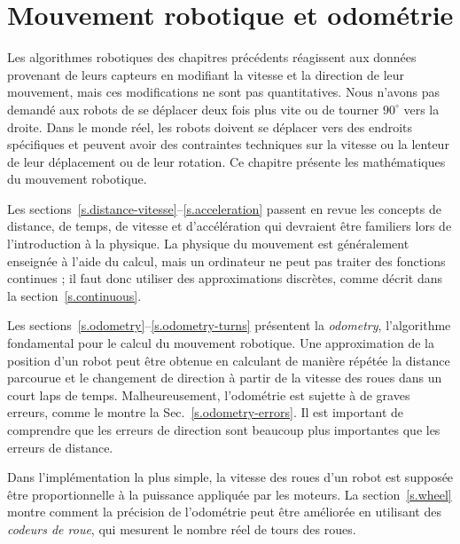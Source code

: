
\chapter{Mouvement robotique et odométrie}\label{ch.motion}

Les algorithmes robotiques des chapitres précédents réagissent aux données provenant de leurs capteurs en modifiant la vitesse et la direction de leur mouvement, mais ces modifications ne sont pas quantitatives. Nous n'avons pas demandé aux robots de se déplacer deux fois plus vite ou de tourner $90^\circ$ vers la droite. Dans le monde réel, les robots doivent se déplacer vers des endroits spécifiques et peuvent avoir des contraintes techniques sur la vitesse ou la lenteur de leur déplacement ou de leur rotation. Ce chapitre présente les mathématiques du mouvement robotique.

Les sections~\ref{s.distance-vitesse}--\ref{s.acceleration} passent en revue les concepts de distance, de temps, de vitesse et d'accélération qui devraient être familiers lors de l'introduction à la physique. La physique du mouvement est généralement enseignée à l'aide du calcul, mais un ordinateur ne peut pas traiter des fonctions continues ; il faut donc utiliser des approximations discrètes, comme décrit dans la section~\ref{s.continuous}.

Les sections~\ref{s.odometry}--\ref{s.odometry-turns} présentent la \emph{odometry}, l'algorithme fondamental pour le calcul du mouvement robotique. Une approximation de la position d'un robot peut être obtenue en calculant de manière répétée la distance parcourue et le changement de direction à partir de la vitesse des roues dans un court laps de temps. Malheureusement, l'odométrie est sujette à de graves erreurs, comme le montre la Sec.~\ref{s.odometry-errors}. Il est important de comprendre que les erreurs de direction sont beaucoup plus importantes que les erreurs de distance.

Dans l'implémentation la plus simple, la vitesse des roues d'un robot est supposée être proportionnelle à la puissance appliquée par les moteurs. La section~\ref{s.wheel} montre comment la précision de l'odométrie peut être améliorée en utilisant des \emph{codeurs de roue}, qui mesurent le nombre réel de tours des roues.

